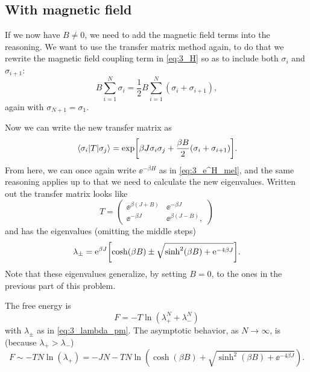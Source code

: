 \documentclass[11pt,letter, swedish, english
]{article}
\begin{document}
\subsection{With magnetic field}
If we now have $B\neq0$, we need to add the magnetic field terms into
the reasoning. We want to use the transfer matrix method again, to do
that we rewrite the magnetic field coupling term in \eqref{eq:3_H} so
as to include both $\sigma_i$ and $\sigma_{i+1}$:
\begin{equation}
B\sum_{i=1}^N\sigma_i=\frac{1}{2}B\sum_{i=1}^N(\sigma_i+\sigma_{i+1}),
\end{equation}
again with $\sigma_{N+1}=\sigma_1$. 

Now we can write the new transfer matrix as
\begin{equation}
\mel{\sigma_i}{T}{\sigma_j}
=\exp[\beta J\sigma_i\sigma_j+\frac{\beta B}{2}(\sigma_i+\sigma_{i+1})].
\end{equation}
From here, we can once again write $\ee^{-\beta H}$ as in
\eqref{eq:3_e^H_mel}, and the same reasoning applies up to that we
need to calculate the new eigenvalues. Written out the transfer matrix 
looks like
\begin{equation}
T=\begin{pmatrix}
\ee^{\beta (J+B)} &\ee^{-\beta J}\\
\ee^{-\beta J} & \ee^{\beta (J-B)},
\end{pmatrix}
\end{equation}
and has the eigenvalues (omitting the middle steps)
\begin{equation}\label{eq:3_lambda_pm}
\lambda_\pm=\mathrm{e}^{\beta J}
\qty[\cosh(\beta B)\pm\sqrt{\sinh^2(\beta B)+\mathrm{e}^{-4\beta J}}].
\end{equation}
Note that these eigenvalues generalize, by setting $B=0$, to the ones
in the previous part of this problem. 

The free energy is
\begin{equation}
F=-T\ln(\lambda_+^N+\lambda_-^N)
\end{equation}
with $\lambda_\pm$ as in \eqref{eq:3_lambda_pm}. The asymptotic
behavior, as $N\to\infty$, is (because $\lambda_+>\lambda_-$)
\begin{equation}
F\sim-TN\ln(\lambda_+)
=-JN -TN\ln(\cosh(\beta B)+\sqrt{\sinh^2(\beta B)+\ee^{-4\beta J}}).
\end{equation}
\end{document}
